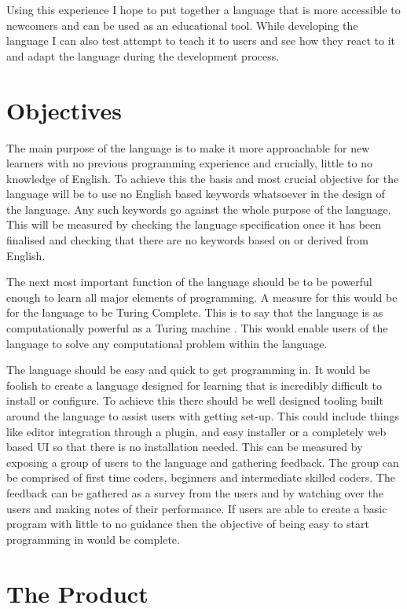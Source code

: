 \documentclass[12pt]{article}
\begin{document}
Using this experience I hope to put together a language that is more accessible to newcomers and can be used as an educational tool.
While developing the language I can also test attempt to teach it to users and see how they react to it and adapt the language during the development process.


\section{Objectives}

The main purpose of the language is to make it more approachable for new learners with no previous programming experience and crucially,
little to no knowledge of English. To achieve this the basis and most crucial objective for the language will be to use no English based
keywords whatsoever in the design of the language. Any such keywords go against the whole purpose of the language.
This will be measured by checking the language specification once it has been finalised and checking that there are no keywords based on or derived from English.

The next most important function of the language should be to be powerful enough to learn all major elements of programming.
A measure for this would be for the language to be Turing Complete. This is to say that the language is as computationally powerful as a Turing machine \parencite{turing1936a}.
This would enable users of the language to solve any computational problem within the language.

The language should be easy and quick to get programming in.
It would be foolish to create a language designed for learning that is incredibly difficult to install or configure.
To achieve this there should be well designed tooling built around the language to assist users with getting set-up.
This could include things like editor integration through a plugin, and easy installer or a completely web based UI so that
there is no installation needed. This can be measured by exposing a group of users to the language and gathering feedback.
The group can be comprised of first time coders, beginners and intermediate skilled coders.
The feedback can be gathered as a survey from the users and by watching over the users and making notes of their performance.
If users are able to create a basic program with little to no guidance then the objective of being easy to start programming in would be complete.

\clearpage

\section{The Product}
\end{document}
